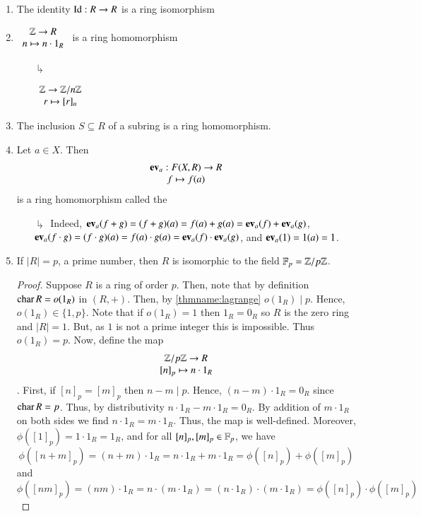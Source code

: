\documentclass[12pt, a4paper, oneside, openright, titlepage]{book}
\begin{document}
\begin{eg}
    \leavevmode
    \begin{enumerate}
        \item The identity $\operatorname{Id}:R \rightarrow R$ is a ring isomorphism
        \item $\begin{array}{c} \mathbb Z\rightarrow R \\ n\mapsto n\cdot 1_R \end{array}$ is a ring homomorphism
        \begin{enumerate}
            \item[$\drsh$] \begin{eg}
                $\begin{array}{c} \mathbb Z\rightarrow \mathbb Z/n\mathbb Z \\ r \mapsto [r]_n \end{array}$
            \end{eg} 
        \end{enumerate}
        \item The inclusion $S \subseteq R$ of a subring is a ring homomorphism.
        \item Let $a \in X$. Then \begin{equation}
            \begin{array}{c} \operatorname{\bf{ev}}_a:F(X,R)\rightarrow R \\ f\mapsto f(a) \end{array}
        \end{equation}
        is a ring homomorphism called the 
        \begin{enumerate}
            \item[$\drsh$] Indeed, $\operatorname{\bf{ev}}_a(f+g) = (f+g)(a) = f(a)+g(a) = \operatorname{\bf{ev}}_a(f) + \operatorname{\bf{ev}}_a(g)$, $\operatorname{\bf{ev}}_a(f\cdot g) = (f\cdot g)(a) = f(a)\cdot g(a) = \operatorname{\bf{ev}}_a(f)\cdot \operatorname{\bf{ev}}_a(g)$, and $\operatorname{\bf{ev}}_a(1) = 1(a) = 1$.
        \end{enumerate}
        \item If $|R| = p$, a prime number, then $R$ is isomorphic to the field $\mathbb F_p = \mathbb Z/p\mathbb Z$.
        \begin{proof}
            Suppose $R$ is a ring of order $p$. Then, note that by definition $\operatorname{char} R = o(1_R)$ in $(R,+)$. Then, by \ref{thmname:lagrange} $o(1_R)\;\vert\;p$. Hence, $o(1_R) \in \{1,p\}$. Note that if $o(1_R) = 1$ then $1_R = 0_R$ so $R$ is the zero ring and $|R| = 1$. But, as $1$ is not a prime integer this is impossible. Thus $o(1_R) = p$. Now, define the map $$\begin{array}{c} \mathbb Z/p\mathbb Z\rightarrow R \\  {[n]}_p \mapsto n\cdot 1_R \end{array}$$. First, if $[n]_p = [m]_p$ then $n - m\;\vert\;p$. Hence, $(n-m)\cdot 1_R = 0_R$ since $\operatorname{char} R = p$. Thus, by distributivity $n\cdot 1_R -m\cdot 1_R = 0_R$. By addition of $m\cdot 1_R$ on both sides we find $n\cdot 1_R = m\cdot 1_R$. Thus, the map is well-defined. Moreover, $\phi([1]_p) = 1\cdot 1_R = 1_R$, and for all $[n]_p,[m]_p \in \mathbb F_p$, we have $$\phi([n+m]_p) = (n+m)\cdot1_R = n\cdot1_R + m\cdot1_R = \phi([n]_p) + \phi([m]_p)$$ and $$\phi([nm]_p) = (nm)\cdot1_R = n\cdot(m\cdot1_R) = (n\cdot 1_R)\cdot(m\cdot1_R) = \phi([n]_p)\cdot \phi([m]_p)$$

\end{proof}
\end{enumerate}
\end{eg}
\end{document}
